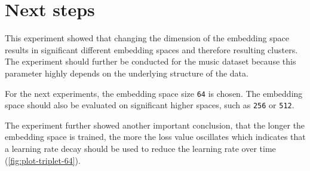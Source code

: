 \documentclass[twocolumn]{article}
\begin{document}
\section{Next steps}
This experiment showed that changing the dimension of the embedding space results in significant different embedding spaces and therefore resulting clusters. The experiment should further be conducted for the music dataset because this parameter highly depends on the underlying structure of the data. 

For the next experiments, the embedding space size \texttt{64} is chosen. The embedding space should also be evaluated on significant higher spaces, such as \texttt{256} or \texttt{512}.

The experiment further showed another important conclusion, that the longer the embedding space is trained, the more the loss value oscillates which indicates that a learning rate decay should be used to reduce the learning rate over time (\ref{fig:plot-triplet-64}).
\end{document}
